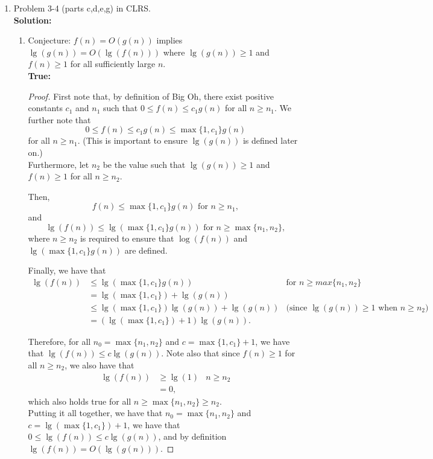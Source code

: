 \documentclass[letterpaper,11pt]{article}
\begin{document}
\begin{enumerate}
\item Problem 3-4 (parts c,d,e,g) in CLRS.\\

\textbf{Solution:}

    \begin{enumerate}
        \item Conjecture: $f(n) = O(g(n))$ implies $\lg (g(n)) = O(\lg(f(n)))$ where $\lg(g(n))\geq 1$ and $f(n) \geq 1$ for all sufficiently large $n$.\\[-8pt]
        
        {\bf True:}
        \begin{proof}
        First note that, by definition of Big Oh, there exist positive constants $c_1$ and $n_1$ such that $0\leq f(n) \leq c_1g(n)$ for all $n\geq n_1$. We further note
        that \[0\leq f(n) \leq c_1g(n) \leq \max\{1,c_1\}g(n)\] for all $n\geq n_1$. (This is important to ensure $\lg(g(n))$ is defined later on.)\\

        Furthermore, let $n_2$ be the value such that $\lg(g(n))\geq 1$ and $f(n) \geq 1$ for all $n\geq n_2$.

        Then,
        \[f(n) \leq \max\{1,c_1\}g(n) \text{ for $n \geq n_1$},\]
        and
        \[\lg(f(n)) \leq \lg(\max\{1,c_1\}g(n)) \text{ for $n \geq \max\{n_1,n_2\}$},\]
        where $n\geq n_2$ is required to ensure that $\log(f(n))$ and $\lg(\max\{1,c_1\}g(n))$ are defined.

        Finally, we have that
        \begin{align*}
        \lg(f(n)) &\leq \lg(\max\{1,c_1\}g(n))& \text{for $n\geq max\{n_1,n_2\}$}\\
                  &= \lg(\max\{1,c_1\}) + \lg(g(n))\\
                  &\leq \lg(\max\{1,c_1\})\lg(g(n)) + \lg(g(n)) & \text{(since $\lg(g(n))\geq 1$ when $n\geq n_2$)}\\
                  &=(\lg(\max\{1,c_1\}) + 1)\lg(g(n)).
        \end{align*}

        Therefore, for all $n_0 = \max\{n_1,n_2\}$ and $c=\max\{1,c_1\} + 1$, we have that $\lg(f(n)) \leq c\lg(g(n))$. Note also that since $f(n)\geq 1$ for all $n\geq n_2$, we also have that
        \begin{align*}
        \lg(f(n)) &\geq \lg(1) &n\geq n_2\\
                  &= 0,
        \end{align*}
        which also holds true for all $n\geq \max\{n_1,n_2\} \geq n_2$. \\
        Putting it all together, we have that $n_0 = \max\{n_1,n_2\}$ and $c=\lg(\max\{1,c_1\}) + 1$, we have that $0\leq \lg(f(n)) \leq c\lg(g(n))$, and by definition $\lg(f(n)) = O(\lg(g(n)))$.
        \end{proof}


\end{enumerate}
\end{enumerate}
\end{document}
